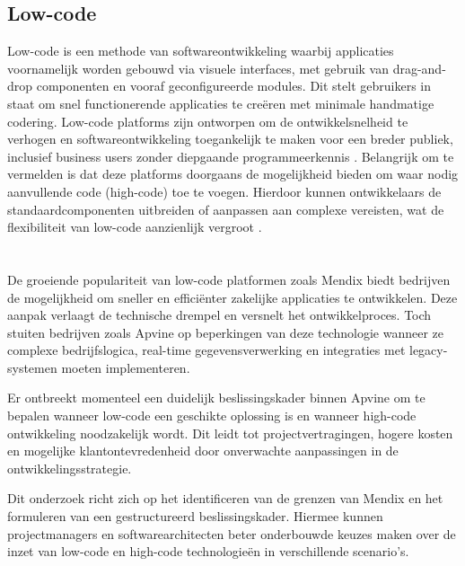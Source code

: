 \subsection{Low-code}
Low-code is een methode van softwareontwikkeling waarbij applicaties voornamelijk worden gebouwd via visuele interfaces, met gebruik van drag-and-drop componenten en vooraf geconfigureerde modules. Dit stelt gebruikers in staat om snel functionerende applicaties te creëren met minimale handmatige codering. Low-code platforms zijn ontworpen om de ontwikkelsnelheid te verhogen en softwareontwikkeling toegankelijk te maken voor een breder publiek, inclusief business users zonder diepgaande programmeerkennis \autocite{Bunce2024}. Belangrijk om te vermelden is dat deze platforms doorgaans de mogelijkheid bieden om waar nodig aanvullende code (high-code) toe te voegen. Hierdoor kunnen ontwikkelaars de standaardcomponenten uitbreiden of aanpassen aan complexe vereisten, wat de flexibiliteit van low-code aanzienlijk vergroot \autocite{Northcutt2023}.

\section{}%
\label{sec:probleemstelling}

De groeiende populariteit van low-code platformen zoals Mendix biedt bedrijven de mogelijkheid om sneller en efficiënter zakelijke applicaties te ontwikkelen. Deze aanpak verlaagt de technische drempel en versnelt het ontwikkelproces. Toch stuiten bedrijven zoals Apvine op beperkingen van deze technologie wanneer ze complexe bedrijfslogica, real-time gegevensverwerking en integraties met legacy-systemen moeten implementeren.

Er ontbreekt momenteel een duidelijk beslissingskader binnen Apvine om te bepalen wanneer low-code een geschikte oplossing is en wanneer high-code ontwikkeling noodzakelijk wordt. Dit leidt tot projectvertragingen, hogere kosten en mogelijke klantontevredenheid door onverwachte aanpassingen in de ontwikkelingsstrategie.

Dit onderzoek richt zich op het identificeren van de grenzen van Mendix en het formuleren van een gestructureerd beslissingskader. Hiermee kunnen projectmanagers en softwarearchitecten beter onderbouwde keuzes maken over de inzet van low-code en high-code technologieën in verschillende scenario's.


\section{}%
\label{sec:onderzoeksvraag}

